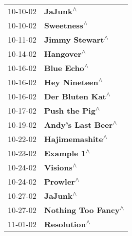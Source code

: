 \begin{supertabular}{p{0.25\columnwidth}p{0.75\columnwidth}}
 10-10-02 &                                                                   \textbf{JaJunk\textsuperscript{$\wedge$}} \\
 10-10-02 &                                                                \textbf{Sweetness\textsuperscript{$\wedge$}} \\
 10-11-02 &                                                            \textbf{Jimmy Stewart\textsuperscript{$\wedge$}} \\
 10-14-02 &                                                                 \textbf{Hangover\textsuperscript{$\wedge$}} \\
 10-16-02 &                                                                \textbf{Blue Echo\textsuperscript{$\wedge$}} \\
 10-16-02 &                                                             \textbf{Hey Nineteen\textsuperscript{$\wedge$}} \\
 10-16-02 &                                                           \textbf{Der Bluten Kat\textsuperscript{$\wedge$}} \\
 10-17-02 &                                                             \textbf{Push the Pig\textsuperscript{$\wedge$}} \\
 10-19-02 &                                                         \textbf{Andy's Last Beer\textsuperscript{$\wedge$}} \\
 10-22-02 &                                                            \textbf{Hajimemashite\textsuperscript{$\wedge$}} \\
 10-23-02 &                                                                \textbf{Example 1\textsuperscript{$\wedge$}} \\
 10-24-02 &                                                                  \textbf{Visions\textsuperscript{$\wedge$}} \\
 10-24-02 &                                                                  \textbf{Prowler\textsuperscript{$\wedge$}} \\
 10-27-02 &                                                                   \textbf{JaJunk\textsuperscript{$\wedge$}} \\
 10-27-02 &                                                        \textbf{Nothing Too Fancy\textsuperscript{$\wedge$}} \\
 11-01-02 &                                                               \textbf{Resolution\textsuperscript{$\wedge$}} \\

\end{supertabular}
